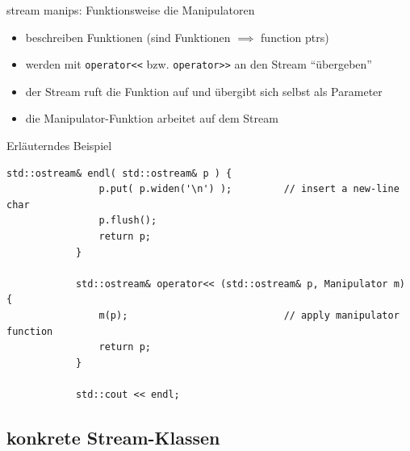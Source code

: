 \begin{frame}[fragile]{stream manips: Funktionsweise}
	\footnotesize
	die Manipulatoren
	\begin{itemize}
		\item beschreiben Funktionen (sind Funktionen $\implies$ function ptrs)
		\item werden mit \texttt{operator<<} bzw. \texttt{operator>>} an den Stream \enquote{übergeben}
		\item der Stream ruft die Funktion auf und übergibt sich selbst als Parameter
		\item die Manipulator-Funktion arbeitet auf dem Stream
	\end{itemize}
	
	\pause
	
	\begin{block}{Erläuterndes Beispiel}
		\begin{lstlisting}[basicstyle=\tiny, xleftmargin=3em]
			std::ostream& endl( std::ostream& p ) {
			    p.put( p.widen('\n') );			// insert a new-line char
			    p.flush();
			    return p;
			}
			
			std::ostream& operator<< (std::ostream& p, Manipulator m) {
			    m(p);							// apply manipulator function
			    return p;
			}
			
			std::cout << endl;
		\end{lstlisting}
	\end{block}
\end{frame}


\subsection{konkrete Stream-Klassen}


